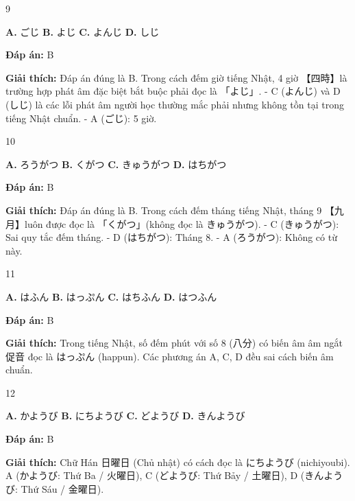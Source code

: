 \documentclass[12pt,a4paper]{report}
\newcommand{\source}[1]{}
\newcommand{\choice}[2]{\textbf{#1.} #2 \quad}
\newcommand{\answer}[1]{\par\textbf{Đáp án:} #1}
\newcommand{\confidence}[1]{}
\newcommand{\explain}[1]{\par\textbf{Giải thích:} #1\vspace{0.5cm}}
\begin{document}
\begin{question}{9}
\source{Q3.jpg}
\choice{A}{ごじ}
\choice{B}{よじ}
\choice{C}{よんじ}
\choice{D}{しじ}
\answer{B}
\confidence{high}
\explain{Đáp án đúng là B. Trong cách đếm giờ tiếng Nhật, 4 giờ 【四時】là trường hợp phát âm đặc biệt bắt buộc phải đọc là 「よじ」.
- C (よんじ) và D (しじ) là các lỗi phát âm người học thường mắc phải nhưng không tồn tại trong tiếng Nhật chuẩn.
- A (ごじ): 5 giờ.}
\end{question}

\begin{question}{10}
\source{Q4.jpg}
\choice{A}{ろうがつ}
\choice{B}{くがつ}
\choice{C}{きゅうがつ}
\choice{D}{はちがつ}
\answer{B}
\confidence{high}
\explain{Đáp án đúng là B. Trong cách đếm tháng tiếng Nhật, tháng 9 【九月】luôn được đọc là 「くがつ」(không đọc là きゅうがつ).
- C (きゅうがつ): Sai quy tắc đếm tháng.
- D (はちがつ): Tháng 8.
- A (ろうがつ): Không có từ này.}
\end{question}

\begin{question}{11}
\source{Q1.jpg}
\choice{A}{はふん}
\choice{B}{はっぷん}
\choice{C}{はちふん}
\choice{D}{はつふん}
\answer{B}
\confidence{high}
\explain{Trong tiếng Nhật, số đếm phút với số 8 (八分) có biến âm âm ngắt促音 đọc là はっぷん (happun). Các phương án A, C, D đều sai cách biến âm chuẩn.}
\end{question}

\begin{question}{12}
\source{Q2.jpg}
\choice{A}{かようび}
\choice{B}{にちようび}
\choice{C}{どようび}
\choice{D}{きんようび}
\answer{B}
\confidence{high}
\explain{Chữ Hán 日曜日 (Chủ nhật) có cách đọc là にちようび (nichiyoubi). A (かようび: Thứ Ba / 火曜日), C (どようび: Thứ Bảy / 土曜日), D (きんようび: Thứ Sáu / 金曜日).}
\end{question}
\end{document}
